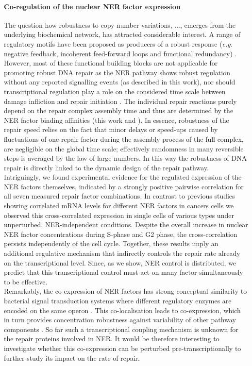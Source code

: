 \paragraph{Co-regulation of the nuclear NER factor expression} The question how robustness to copy number variations, ..., emerges from the underlying biochemical network, has attracted considerable interest. A range of regulatory motifs have been proposed as producers of a robust response (\textit{e.g.} negative feedback, incoherent feed-forward loops and functional redundancy) \cite{Alon2007,Bleris2011,Yi2000,Manuscript2011}. However, most of these functional building blocks are not applicable for promoting robust DNA repair as the NER pathway shows robust regulation without any reported signalling events (as described in this work), nor should transcriptional regulation play a role on the considered time scale between damage infliction and repair initiation \cite{Mone2001}. The individual repair reactions purely depend on the repair complex assembly time and thus are determined by the NER factor binding affinities (this work and \cite{Luijsterburg2010}). In essence, robustness of the repair speed relies on the fact that minor delays or speed-ups caused by fluctuations of one repair factor during the assembly process of the full complex, are negligible on the global time scale; effectively randomness in many reversible steps is averaged by the law of large numbers. In this way the robustness of DNA repair is directly linked to the dynamic design of the repair pathway.\\     
Intriguingly, we found experimental evidence for the regulated expression of the NER factors themselves, indicated by a strongly positive pairwise correlation for all seven measured repair factor combinations. In contrast to previous studies showing correlated mRNA levels for different NER factors in cancers cells \cite{Damia1998,Cheng2000} we observed this cross-correlated expression in single cells of various types under unperturbed, NER-independent conditions. Despite the overall increase in nuclear NER factor concentrations during S-phase and G2 phase, the cross-correlation persists independently of the cell cycle. Together, these results imply an additional regulative mechanism that indirectly controls the repair rate already on the transcriptional level. Since, as we show, NER control is distributed, we predict that this transcriptional control must act on many factor simultaneously to be effective.\\
Remarkably, the co-expression of NER factors has strong conceptual similarity to bacterial signal transduction systems where different regulatory enzymes are encoded on the same operon \cite{Kollmann2005,Lovdok2009}. This co-localisation leads to co-expression, which in turn provides concentration robustness against variability of other pathway components \cite{Bluthgen2013}. So far such a transcriptional coupling mechanism is unknown for the repair proteins involved in NER. It would be therefore interesting to investigate whether this co-expression can be perturbed pre-transcriptionally to further study its impact on the rate of repair. 

